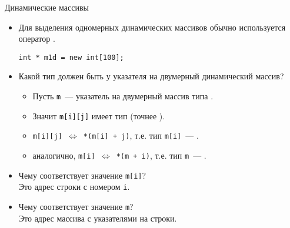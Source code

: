 \documentclass{beamer}
\begin{document}
\begin{frame}[fragile]{Динамические массивы}
    \begin{itemize}
        \item Для выделения одномерных динамических массивов
            обычно используется оператор .
\begin{lstlisting}
int * m1d = new int[100];
\end{lstlisting}
        \item Какой тип должен быть у указателя на двумерный динамический
            массив?
            \begin{itemize}
                \item Пусть {\tt m}~--- указатель на двумерный массив типа .

                \item Значит {\tt m[i][j]} имеет тип  (точнее
                    ).

                \item {\tt m[i][j] $\Leftrightarrow$ *(m[i] + j)},
                    т.е. тип {\tt m[i]}~--- .

                \item аналогично, {\tt m[i] $\Leftrightarrow$ *(m + i)},
                    т.е. тип {\tt m}~--- .
            \end{itemize}
            \item Чему соответствует значение {\tt m[i]}?\\ 
                Это адрес строки с номером {\tt i}.

            \item Чему соответствует значение {\tt m}?\\
                Это адрес массива с указателями на строки.
    \end{itemize}
\end{frame}
\end{document}
